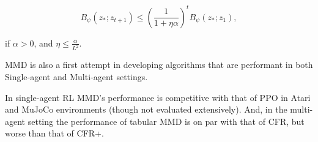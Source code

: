 $$ B_{\psi} (z_{\ast}; z_{t + 1}) \leq \left(\frac{1}{1 + \eta \alpha}\right)^t B_{\psi} (z_{\ast}; z_1),$$

if $\alpha > 0$, and $\eta \leq \frac{\alpha}{L^2}$.




MMD is also a first attempt in developing algorithms that are performant in both
Single-agent and Multi-agent settings.

In single-agent RL MMD's performance is competitive with that of PPO in Atari and MuJoCo environments
(though not evaluated extensively). And, in the multi-agent setting the performance of tabular MMD is on par
with that of CFR, but worse than that of CFR+.